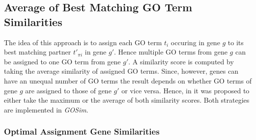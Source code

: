 \documentclass[12pt,a4paper]{article}
\begin{document}
\subsection{Average of Best Matching GO Term Similarities }

The idea of this approach \cite{Schlicker2006GOFuncSim} is to assign each GO term $t_i$ occuring in gene $g$ to its best matching partner $t'_{\pi{i}}$ in gene $g'$. Hence multiple GO terms from gene $g$ can be assigned to one GO term from gene $g'$. A similarity score is computed by taking the average similarity of assigned GO terms. Since, however, genes can have an unequal number of GO terms the result depends on whether GO terms of gene $g$ are assigned to those of gene $g'$ or vice versa. Hence, in \cite{Schlicker2006GOFuncSim} it was proposed to either take the maximum or the average of both similarity scores. Both strategies are implemented in \emph{GOSim}. 

\subsubsection{Optimal Assignment Gene Similarities}
\end{document}
